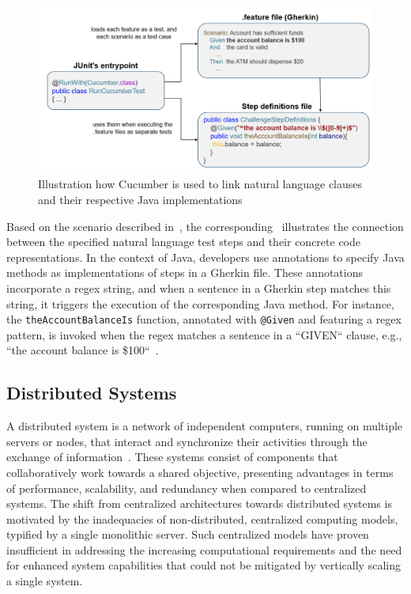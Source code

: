 \begin{figure}
    \centering
    \includegraphics[width=\linewidth]{files/figures/cucumber_test_step_mapping.png}
    \caption{Illustration how Cucumber is used to link natural language clauses and their respective Java implementations}
    \label{fig:cucumber-mapping}
\end{figure}

Based on the scenario described in~, the corresponding~ illustrates the connection between the specified natural language test steps and their concrete code representations. In the context of Java, developers use annotations to specify Java methods as implementations of steps in a Gherkin file. These annotations incorporate a regex string, and when a sentence in a Gherkin step matches this string, it triggers the execution of the corresponding Java method. For instance, the \texttt{theAccountBalanceIs} function, annotated with \texttt{@Given} and featuring a regex pattern, is invoked when the regex matches a sentence in a ``GIVEN`` clause, e.g., ``the account balance is \$100``~\cite{noauthor_bdd_nodate}.

\subsection{Distributed Systems}
\label{subsec:dissys}
A distributed system is a network of independent computers, running on multiple servers or nodes, that interact and synchronize their activities through the exchange of information~\cite{tanenbaum2007distributed}. These systems consist of components that collaboratively work towards a shared objective, presenting advantages in terms of performance, scalability, and redundancy when compared to centralized systems. The shift from centralized architectures towards distributed systems is motivated by the inadequacies of non-distributed, centralized computing models, typified by a single monolithic server. Such centralized models have proven insufficient in addressing the increasing computational requirements and the need for enhanced system capabilities that could not be mitigated by vertically scaling a single system.

